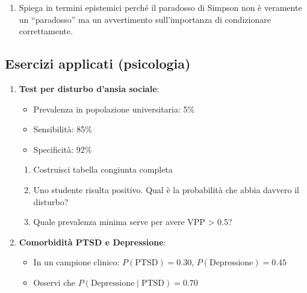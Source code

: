 \documentclass[
  letterpaper,
  DIV=11,
  numbers=noendperiod,
  oneside]{scrreprt}
\providecommand{\tightlist}{%
  \setlength{\itemsep}{0pt}\setlength{\parskip}{0pt}}
\theoremstyle{definition}
\theoremstyle{plain}
\theoremstyle{definition}
\theoremstyle{remark}
\begin{document}
\begin{tcolorbox}
\begin{enumerate}
  \begin{enumerate}
  \def\labelenumii{\alph{enumii}.}
  \tightlist
  \item
    In ciascun gruppo, il farmaco è migliore?
  \item
    Calcola le proporzioni aggregate (tutti i pazienti insieme)
  \item
    Costruisci uno scenario dove l'aggregato inverte la tendenza
  \end{enumerate}
\item
  Spiega in termini epistemici perché il paradosso di Simpson non è
  veramente un ``paradosso'' ma un avvertimento sull'importanza di
  condizionare correttamente.
\end{enumerate}

\subsection{Esercizi applicati
(psicologia)}\label{esercizi-applicati-psicologia-1}

\begin{enumerate}
\def\labelenumi{\arabic{enumi}.}
\setcounter{enumi}{19}
\tightlist
\item
  \textbf{Test per disturbo d'ansia sociale}:

  \begin{itemize}
  \tightlist
  \item
    Prevalenza in popolazione universitaria: 5\%
  \item
    Sensibilità: 85\%
  \item
    Specificità: 92\%
  \end{itemize}

  \begin{enumerate}
  \def\labelenumii{\alph{enumii}.}
  \tightlist
  \item
    Costruisci tabella congiunta completa
  \item
    Uno studente risulta positivo. Qual è la probabilità che abbia
    davvero il disturbo?
  \item
    Quale prevalenza minima serve per avere VPP \textgreater{} 0.5?
  \end{enumerate}
\item
  \textbf{Comorbidità PTSD e Depressione}:

  \begin{itemize}
  \tightlist
  \item
    In un campione clinico: \(P(\text{PTSD}) = 0.30\),
    \(P(\text{Depressione}) = 0.45\)
  \item
    Osservi che \(P(\text{Depressione} \mid \text{PTSD}) = 0.70\)
  \end{itemize}


\end{enumerate}
\end{tcolorbox}
\end{document}
